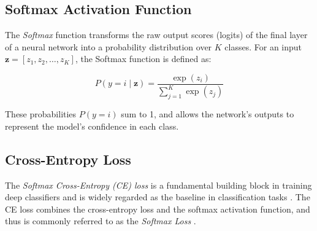 




\subsection{Softmax Activation Function}
\label{sec:softmax}
The \textit{Softmax} function transforms the raw output scores (logits) of the final layer of a neural network into a probability distribution over \( K \) classes. For an input \( \mathbf{z} = [z_1, z_2, \dots, z_K] \), the Softmax function is defined as:

\begin{equation}
    \label{eq:softmax}
    P(y = i \mid \mathbf{z}) = \frac{\exp(z_i)}{\sum_{j=1}^{K} \exp(z_j)}
\end{equation}

These probabilities $P(y=i)$ sum to 1, and allows the network's outputs to represent the model's confidence in each class.

\subsection{Cross-Entropy Loss}
\label{sec:ce_loss}
The \emph{Softmax Cross-Entropy (CE) loss} is a fundamental building block in training deep classifiers and is widely regarded as the baseline in classification tasks \cite{zhang2023deep, cs231n, pytorch_crossentropy}. The CE loss combines the cross-entropy loss and the softmax activation function, and thus is commonly referred to as the \emph{Softmax Loss} \cite{zhang2023dive,Goodfellow-et-al-2016,zhang2023deep}. 

